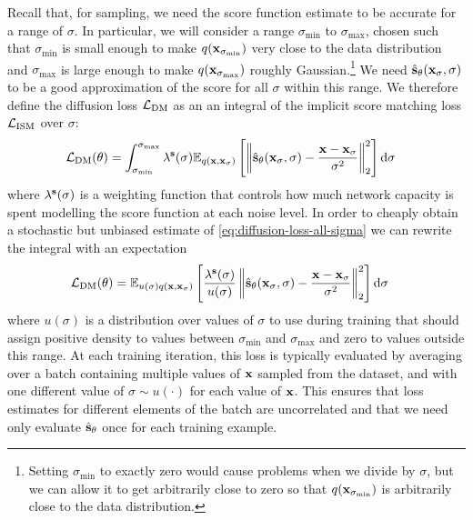 Recall that, for sampling, we need the score function estimate to be accurate for a range of $\sigma$. In particular, we will consider a range $\sigma_\text{min}$ to $\sigma_\text{max}$, chosen such that $\sigma_\text{min}$ is small enough to make $q({\mathbf{x}}_{\sigma_\text{min}})$ very close to the data distribution and $\sigma_\text{max}$ is large enough to make $q({\mathbf{x}}_{\sigma_\text{max}})$ roughly Gaussian.\footnote{Setting $\sigma_\text{min}$ to exactly zero would cause problems when we divide by $\sigma$, but we can allow it to get arbitrarily close to zero so that $q({\mathbf{x}}_{\sigma_\text{min}})$ is arbitrarily close to the data distribution.} We need $\hat{{\mathbf{s}}}_\theta({\mathbf{x}}_\sigma, \sigma)$ to be a good approximation of the score for all $\sigma$ within this range. We therefore define the diffusion loss ${\mathcal{L}}_\text{DM}$ as an an integral of the implicit score matching loss ${\mathcal{L}}_\text{ISM}$ over $\sigma$:
\begin{align} \label{eq:diffusion-loss-all-sigma}
    \mathcal{L}_\text{DM}(\theta) &= \int_{\sigma_\text{min}}^{\sigma_\text{max}} \lambda^{\mathbf{s}}(\sigma) \mathbb{E}_{q({\mathbf{x}}, {\mathbf{x}}_\sigma)} \left[ 
    \left\| \hat{{\mathbf{s}}}_\theta({\mathbf{x}}_\sigma, \sigma) - \frac{{\mathbf{x}}-{\mathbf{x}}_\sigma}{\sigma^2} \right\|_2^2 \right] \mathrm{d}\sigma
\end{align}
where $\lambda^{\mathbf{s}}(\sigma)$ is a weighting function that controls how much network capacity is spent modelling the score function at each noise level. In order to cheaply obtain a stochastic but unbiased estimate of \cref{eq:diffusion-loss-all-sigma} we can rewrite the integral with an expectation
\begin{align} \label{eq:exp-diffusion-loss-all-sigma}
    \mathcal{L}_\text{DM}(\theta) &= \mathbb{E}_{u(\sigma)q({\mathbf{x}}, {\mathbf{x}}_\sigma)} \left[ \frac{\lambda^{\mathbf{s}}(\sigma)}{u(\sigma)} 
    \left\| \hat{{\mathbf{s}}}_\theta({\mathbf{x}}_\sigma, \sigma) - \frac{{\mathbf{x}}-{\mathbf{x}}_\sigma}{\sigma^2} \right\|_2^2 \right] \mathrm{d}\sigma
\end{align}
where $u(\sigma)$ is a distribution over values of $\sigma$ to use during training that should assign positive density to values between $\sigma_\text{min}$ and $\sigma_\text{max}$ and zero to values outside this range. At each training iteration, this loss is typically evaluated by averaging over a batch containing multiple values of ${\mathbf{x}}$ sampled from the dataset, and with one different value of $\sigma \sim u(\cdot)$ for each value of ${\mathbf{x}}$. This ensures that loss estimates for different elements of the batch are uncorrelated and that we need only evaluate $\hat{{\mathbf{s}}}_\theta$ once for each training example.


